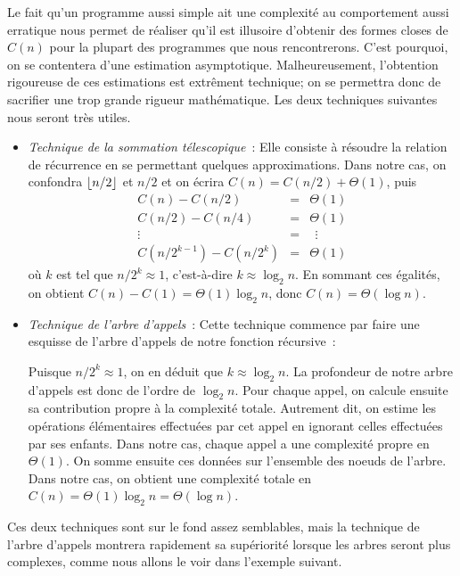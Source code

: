\documentclass{magnolia}
\begin{document}
Le fait qu'un programme aussi simple ait une complexité au comportement aussi erratique
nous permet de réaliser qu'il est illusoire d'obtenir des formes closes de $C(n)$
pour la plupart des programmes que nous rencontrerons. C'est pourquoi, on se contentera
d'une estimation asymptotique. Malheureusement, l'obtention rigoureuse de ces estimations
est extrêment technique; on se permettra donc de sacrifier une trop grande rigueur
mathématique. Les deux techniques suivantes nous seront très utiles.
\begin{itemize}
\item \emph{Technique de la sommation télescopique}~: Elle consiste à \og résoudre \fg la
  relation de récurrence en se permettant quelques approximations. Dans notre cas,
  on confondra $\left\lfloor n/2\right\rfloor$ et $n/2$ et on écrira $C(n)=C(n/2)+\Theta(1)$, puis
\begin{eqnarray*}
C(n)-C(n/2)&=&\Theta(1)\\
C(n/2)-C(n/4)&=&\Theta(1)\\
\vdots\quad\ \ \qquad&=&\ \ \vdots\\
C(n/2^{k-1})-C(n/2^{k})&=&\Theta(1)
\end{eqnarray*}
  où $k$ est tel que $n/2^{k}\approx 1$, c'est-à-dire $k\approx \log_2 n$. En sommant
  ces égalités, on obtient $C(n)-C(1)=\Theta(1)\log_2 n$, donc $C(n)=\Theta(\log n)$.
\item \emph{Technique de l'arbre d'appels}~: Cette technique commence par faire une
  esquisse de l'arbre d'appels de notre fonction récursive~:
  \begin{center}
  \vspace{2ex}
  \vspace{2ex}
  \end{center}
  Puisque $n/2^k\approx 1$, on en déduit que $k\approx \log_2 n$. La
  profondeur de notre arbre d'appels est donc de l'ordre de $\log_2 n$. Pour chaque appel,
  on calcule ensuite sa contribution propre à la complexité totale. Autrement dit, on
  estime les opérations élémentaires effectuées par cet appel en ignorant celles
  effectuées par ses enfants. Dans notre cas, chaque appel a une complexité propre
  en $\Theta(1)$. On somme ensuite ces données sur l'ensemble des noeuds de
  l'arbre. Dans notre cas, on obtient une complexité totale en $C(n)=\Theta(1)\log_2 n=
  \Theta(\log n)$.
\end{itemize}
Ces deux techniques sont sur le fond assez semblables, mais la technique de l'arbre
d'appels montrera rapidement sa supériorité lorsque les arbres seront plus
complexes, comme nous allons le voir dans l'exemple suivant.\\
\end{document}
